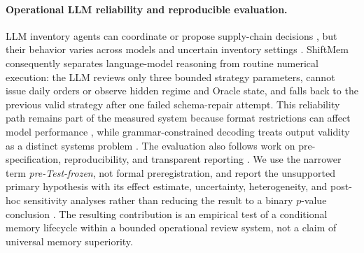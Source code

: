 \paragraph{Operational LLM reliability and reproducible evaluation.}
LLM inventory agents can coordinate or propose supply-chain decisions
\citep{quan2024invagent}, but their behavior varies across models and uncertain
inventory settings \citep{zhao2025aimbench}. ShiftMem consequently separates
language-model reasoning from routine numerical execution: the LLM reviews only
three bounded strategy parameters, cannot issue daily orders or observe hidden
regime and Oracle state, and falls back to the previous valid strategy after one
failed schema-repair attempt. This reliability path remains part of the measured
system because format restrictions can affect model performance
\citep{tam2024letmespeak}, while grammar-constrained decoding treats output
validity as a distinct systems problem \citep{geng2023grammarconstrained}. The
evaluation also follows work on pre-specification, reproducibility, and transparent
reporting \citep{nosek2018preregistration,pineau2021reproducibility,
dodge2019showyourwork}. We use the narrower term \emph{pre-Test-frozen}, not
formal preregistration, and report the unsupported primary hypothesis with its
effect estimate, uncertainty, heterogeneity, and post-hoc sensitivity analyses
rather than reducing the result to a binary $p$-value conclusion
\citep{wasserstein2016asa}. The resulting contribution is an empirical test of a
conditional memory lifecycle within a bounded operational review system, not a
claim of universal memory superiority.
